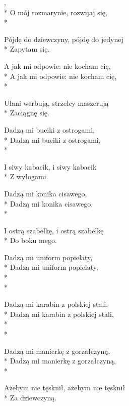 \begin{lyrics}[longestline={Sto dwadzieścia kulek, sto dwadzieścia kulek}]

,\\*
O mój rozmarynie, rozwijaj się,\\*
\begin{markverses}%
Pójdę do dziewczyny, pójdę do jedynej\\*
Zapytam się.
\end{markverses}

A jak mi odpowie: nie kocham cię,\\*
A jak mi odpowie: nie kocham cię,\\*
\begin{markverses}%
Ułani werbują, strzelcy maszerują\\*
Zaciągnę się.
\end{markverses}

Dadzą mi buciki z ostrogami,\\*
Dadzą mi buciki z ostrogami,\\*
\begin{markverses}%
I siwy kabacik, i siwy kabacik\\*
Z wyłogami.
\end{markverses}

Dadzą mi konika cisawego,\\*
Dadzą mi konika cisawego,\\*
\begin{markverses}%
I ostrą szabelkę, i ostrą szabelkę\\*
Do boku mego.
\end{markverses}

Dadzą mi uniform popielaty,\\*
Dadzą mi uniform popielaty,\\*
\\*

Dadzą mi karabin z polskiej stali,\\*
Dadzą mi karabin z polskiej stali,\\*
\\*

\breaklyrics

Dadzą mi manierkę z gorzałczyną,\\*
Dadzą mi manierkę z gorzałczyną,\\*
\begin{markverses}%
Ażebym nie tęsknił, ażebym nie tęsknił\\*
Za dziewczyną.
\end{markverses}


\end{lyrics}

